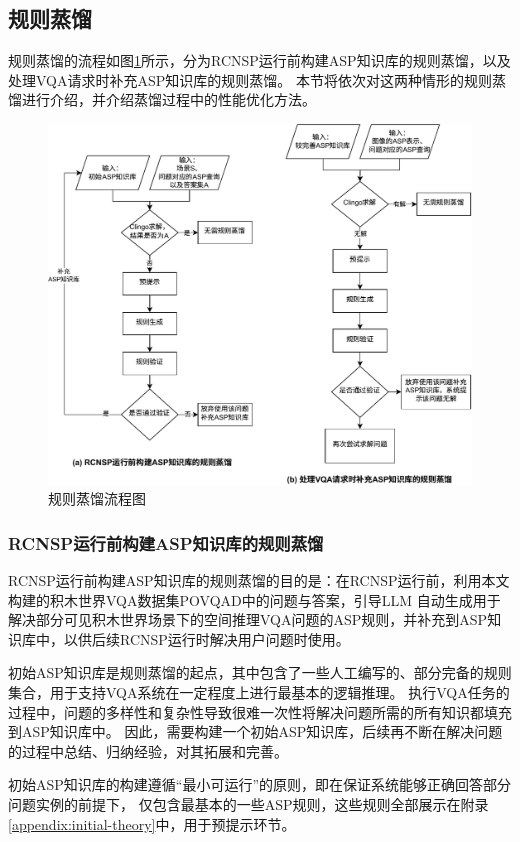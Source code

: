 \subsection{规则蒸馏}
规则蒸馏的流程如图\ref{distill-process}所示，分为RCNSP运行前构建ASP知识库的规则蒸馏，以及处理VQA请求时补充ASP知识库的规则蒸馏。
本节将依次对这两种情形的规则蒸馏进行介绍，并介绍蒸馏过程中的性能优化方法。
\begin{figure}[h]
    \centering
    \includegraphics[scale=0.9]{figures/distillation.drawio-crop.pdf}
    \caption{规则蒸馏流程图}
    \label{distill-process}
\end{figure}
\subsubsection{RCNSP运行前构建ASP知识库的规则蒸馏}
RCNSP运行前构建ASP知识库的规则蒸馏的目的是：在RCNSP运行前，利用本文构建的积木世界VQA数据集POVQAD中的问题与答案，引导LLM
自动生成用于解决部分可见积木世界场景下的空间推理VQA问题的ASP规则，并补充到ASP知识库中，以供后续RCNSP运行时解决用户问题时使用。

初始ASP知识库是规则蒸馏的起点，其中包含了一些人工编写的、部分完备的规则集合，用于支持VQA系统在一定程度上进行最基本的逻辑推理。
执行VQA任务的过程中，问题的多样性和复杂性导致很难一次性将解决问题所需的所有知识都填充到ASP知识库中。
因此，需要构建一个初始ASP知识库，后续再不断在解决问题的过程中总结、归纳经验，对其拓展和完善。

初始ASP知识库的构建遵循“最小可运行”的原则，即在保证系统能够正确回答部分问题实例的前提下，
仅包含最基本的一些ASP规则，这些规则全部展示在附录\ref{appendix:initial-theory}中，用于预提示环节。

